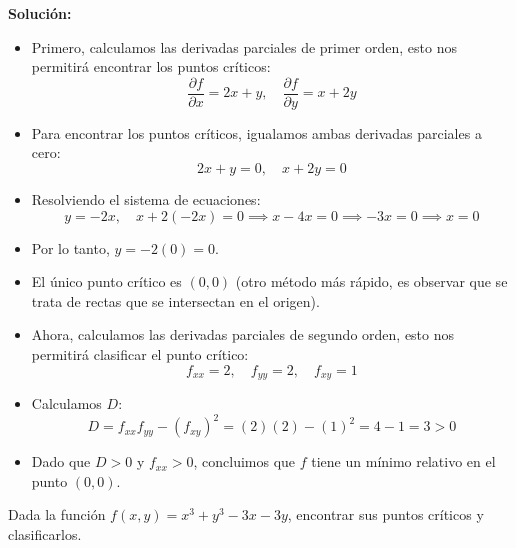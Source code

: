 \textbf{Solución:}
\begin{itemize}
    \item Primero, calculamos las derivadas parciales de primer orden, esto nos permitirá encontrar los puntos críticos:
    \[
    \frac{\partial f}{\partial x} = 2x + y, \quad \frac{\partial f}{\partial y} = x + 2y
    \]
    \item Para encontrar los puntos críticos, igualamos ambas derivadas parciales a cero:
    \[
    2x + y = 0, \quad x + 2y = 0
    \]
    \item Resolviendo el sistema de ecuaciones:
    \[
    y = -2x, \quad x + 2(-2x) = 0 \implies x - 4x = 0 \implies -3x = 0 \implies x = 0
    \]
    \item Por lo tanto, $y = -2(0) = 0$.
    \item El único punto crítico es $(0,0)$ (otro método más rápido, es observar que se trata de rectas que se intersectan en el origen).
    \item Ahora, calculamos las derivadas parciales de segundo orden, esto nos permitirá clasificar el punto crítico:
    \[
    f_{xx} = 2, \quad f_{yy} = 2, \quad f_{xy} = 1
    \]
    \item Calculamos $D$:
    \[
    D = f_{xx}f_{yy} - (f_{xy})^2 = (2)(2) - (1)^2 = 4 - 1 = 3 > 0
    \]
    \item Dado que $D > 0$ y $f_{xx} > 0$, concluimos que $f$ tiene un mínimo relativo en el punto $(0,0)$.
\end{itemize}

\begin{ejemplo}
    Dada la función $f(x,y)=x^3+y^3-3x-3y$, encontrar sus puntos críticos y clasificarlos.
\end{ejemplo}

